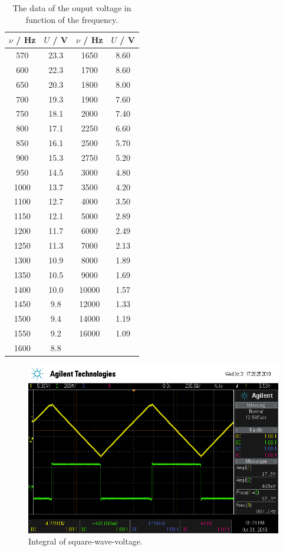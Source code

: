 \begin{table}
  \centering
  \caption{The data of the ouput voltage in function of the frequency.}
  \label{tab:2}
  \begin{tabular}{c c| c c}
    \toprule
    $\nu$ / \si{\hertz} & $U$ / \si{\volt} & $\nu$ / \si{\hertz} & $U$ / \si{\volt} \\
    \midrule
    570  & 23.3  &  1650  & 8.60 \\
    600  & 22.3  &  1700  & 8.60 \\
    650  & 20.3  &  1800  & 8.00 \\
    700  & 19.3  &  1900  & 7.60 \\
    750  & 18.1  &  2000  & 7.40 \\
    800  & 17.1  &  2250  & 6.60 \\
    850  & 16.1  &  2500  & 5.70 \\
    900  & 15.3  &  2750  & 5.20 \\
    950  & 14.5  &  3000  & 4.80 \\
    1000 & 13.7  &  3500  & 4.20 \\
    1100 & 12.7  &  4000  & 3.50 \\
    1150 & 12.1  &  5000  & 2.89 \\
    1200 & 11.7  &  6000  & 2.49 \\
    1250 & 11.3  &  7000  & 2.13 \\
    1300 & 10.9  &  8000  & 1.89 \\
    1350 & 10.5  &  9000  & 1.69 \\
    1400 & 10.0  &  10000 & 1.57 \\
    1450 & 9.8   &  12000 & 1.33 \\
    1500 & 9.4   &  14000 & 1.19 \\
    1550 & 9.2   &  16000 & 1.09 \\
    1600 & 8.8   &        &      \\
    \bottomrule
  \end{tabular}
\end{table}
\begin{figure}
  \centering
  \includegraphics[scale=0.4]{scope_2.png}
  \caption{Integral of square-wave-voltage.}
  \label{abb:3}
\end{figure}
